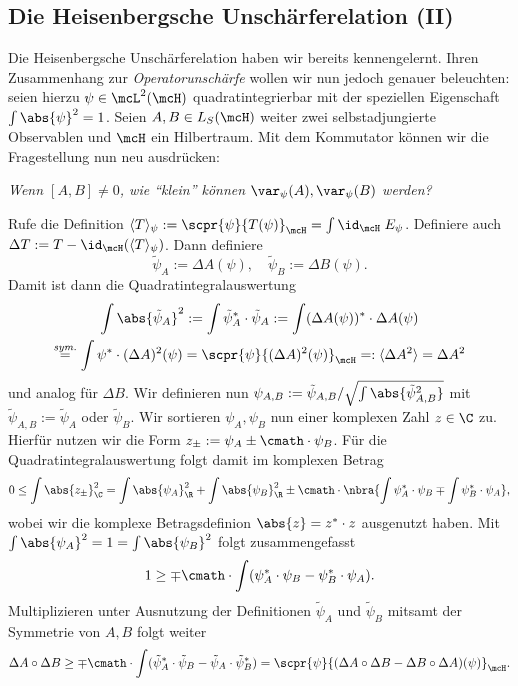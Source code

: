 \documentclass{subfiles}
\begin{document}
    \subsection{Die Heisenbergsche Unschärferelation (II)}
        Die Heisenbergsche Unschärferelation haben wir bereits kennengelernt. Ihren Zusammenhang zur \emph{Operatorunschärfe} wollen wir nun jedoch genauer beleuchten: seien hierzu $\psi\in\mcL^2(\mcH)$ quadratintegrierbar mit der speziellen Eigenschaft $\int\abs{\psi}^2 = 1$. Seien $A,B\in L_S(\mcH)$ weiter zwei selbstadjungierte Observablen und $\mcH$ ein Hilbertraum. Mit dem Kommutator können wir die Fragestellung nun neu ausdrücken:
        \begin{center}
            \textit{Wenn $[A,B]\neq 0$, wie \enquote{klein} können $\var_\psi(A),\var_\psi(B)$ werden?}
        \end{center}
        Rufe die Definition $\langle T\rangle_\psi := \scpr{\psi}{T(\psi)}_\mcH = \int\id_\mcH\;E_\psi$. Definiere auch $\Delta T:= T-\id_{\mcH}(\langle T\rangle_\psi)$. Dann definiere 
        \[\tilde\psi_A:=\Delta A(\psi),\quad \tilde\psi_B:=\Delta B(\psi).\]
        Damit ist dann die Quadratintegralauswertung
        \begin{multline*}
            \int\abs{\tilde\psi_A}^2 := \int\tilde\psi_A^*\cdot\tilde\psi_A := \int (\Delta A(\psi))^*\cdot \Delta A(\psi) \\
            \stackrel{\textit{sym.}}{=} \int \psi^*\cdot (\Delta A)^2(\psi) = \scpr{\psi}{(\Delta A)^2(\psi)}_\mcH =: \langle\Delta A^2\rangle = \Delta A^2
        \end{multline*}
        und analog für $\Delta B$. Wir definieren nun $\psi_{A,B}:=\tilde\psi_{A,B}/\sqrt{\int\abs{\tilde\psi_{A,B}^2}}$ mit $\tilde\psi_{A,B}:= \tilde\psi_A$ oder $\tilde\psi_B$. Wir sortieren $\psi_A,\psi_B$ nun einer komplexen Zahl $z\in\C$ zu. Hierfür nutzen wir die Form $z_\pm:=\psi_A\pm\cmath\cdot\psi_B$. Für die Quadratintegralauswertung folgt damit im komplexen Betrag
        \[0\leq\int\abs{z_\pm}_\C^2 = \int\abs{\psi_A}_\R^2+\int\abs{\psi_B}_\R^2\pm\cmath\cdot\nbra{\int\psi_A^*\cdot\psi_B\mp\int\psi_B^*\cdot\psi_A},\]
        wobei wir die komplexe Betragsdefinion $\abs{z} = z^*\cdot z$ ausgenutzt haben. Mit $\int\abs{\psi_A}^2 = 1 = \int\abs{\psi_B}^2$ folgt zusammengefasst
        \[1\geq \mp\cmath\cdot\int (\psi_A^*\cdot\psi_B - \psi_B^*\cdot\psi_A).\]
        Multiplizieren unter Ausnutzung der Definitionen $\tilde\psi_A$ und $\tilde\psi_B$ mitsamt der Symmetrie von $A,B$ folgt weiter
        \[\Delta A\circ\Delta B\geq\mp\cmath\cdot\int(\tilde\psi_A^*\cdot\tilde\psi_B-\tilde\psi_A\cdot\tilde\psi_B^*) = \scpr{\psi}{(\Delta A\circ\Delta B-\Delta B\circ\Delta A)(\psi)}_\mcH.\]
\end{document}
